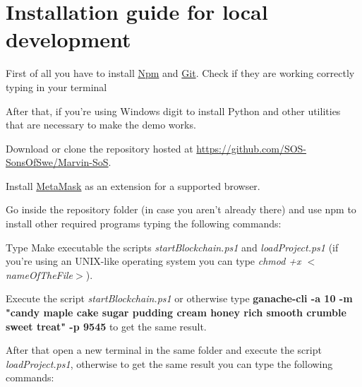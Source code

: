 \section{Installation guide for local development}
First of all you have to install \href{https://www.npmjs.com/}{Npm} and \href{https://git-scm.com/}{Git}. Check if they are working correctly typing in your terminal 

After that, if you're using Windows digit  to install Python and other utilities that are necessary to make the demo works.

Download or clone the repository hosted at \url{https://github.com/SOS-SonsOfSwe/Marvin-SoS}.

Install \href{https://metamask.io/}{MetaMask} as an extension for a supported browser.

\noindent Go inside the repository folder (in case you aren't already there) and use npm to install other required programs typing the following commands:

Type 
\label{GanacheDeployment}
Make executable the scripts \emph{startBlockchain.ps1} and \emph{loadProject.ps1} (if you're using an UNIX-like operating system you can type \emph{chmod +x $<$nameOfTheFile$>$}).

Execute the script \emph{startBlockchain.ps1} or otherwise type \textbf{ganache-cli -a 10 -m "candy maple cake sugar pudding cream honey rich smooth crumble sweet treat" -p 9545} to get the same result.

After that open a new terminal in the same folder and execute the script \emph{loadProject.ps1}, otherwise to get the same result you can type the following commands:

